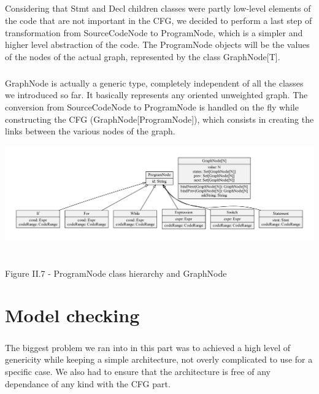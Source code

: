 \documentclass{report}
\begin{document}
\paragraph{}
\hspace{4mm}Considering that Stmt and Decl children classes were partly low-level elements of the code that are not important
in the CFG, we decided to perform a last step of transformation from SourceCodeNode to ProgramNode, which is a simpler and higher level abstraction of the code.
The ProgramNode objects will be the values of the nodes of the actual graph, represented by the class GraphNode[T].

\paragraph{}
\hspace{4mm}GraphNode is actually a generic type, completely independent of all the classes we introduced so far.
It basically represents any oriented unweighted graph. The conversion from SourceCodeNode to
ProgramNode is handled on the fly while constructing the CFG (GraphNode[ProgramNode]), which
consists in creating the links between the various nodes of the graph.

\begin{center}
\includegraphics[scale=0.5]{data/CFG_classes}
~\\~\\Figure II.7 - ProgramNode class hierarchy and GraphNode
\end{center}

\chapter{Model checking}

\paragraph{}
\hspace{4mm}The biggest problem we ran into in this part was to achieved a high level of genericity while keeping
a simple architecture, not overly complicated to use for a specific case. We also had to ensure that the architecture is
free of any dependance of any kind with the CFG part.
\end{document}
